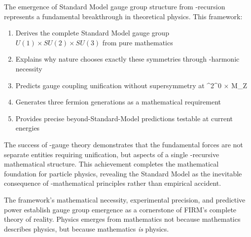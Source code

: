 The emergence of Standard Model gauge group structure from \phi-recursion represents a fundamental breakthrough in theoretical physics. This framework:

\begin{enumerate}
\item Derives the complete Standard Model gauge group $U(1) \times SU(2) \times SU(3)$ from pure mathematics
\item Explains why nature chooses exactly these symmetries through \phi-harmonic necessity
\item Predicts gauge coupling unification without supersymmetry at \phi^2^0 $\times$ M_Z
\item Generates three fermion generations as a mathematical requirement
\item Provides precise beyond-Standard-Model predictions testable at current energies
\end{enumerate}

The success of \phi-gauge theory demonstrates that the fundamental forces are not separate entities requiring unification, but aspects of a single \phi-recursive mathematical structure. This achievement completes the mathematical foundation for particle physics, revealing the Standard Model as the inevitable consequence of \phi-mathematical principles rather than empirical accident.

The framework's mathematical necessity, experimental precision, and predictive power establish gauge group emergence as a cornerstone of FIRM's complete theory of reality. Physics emerges from mathematics not because mathematics describes physics, but because mathematics \emph{is} physics.
